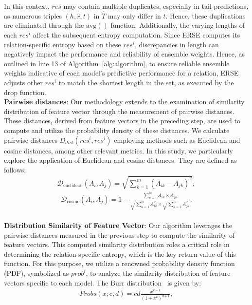 \documentclass{article}
\begin{document}
In this context, $res$ may contain multiple duplicates, especially in tail-predictions, as numerous triples $(h, \hat{r}, t)$ in $\hat{T}$ may only differ in $t$. Hence, these duplications are eliminated through the $\mathrm{avg()}$ function. Additionally, the varying lengths of each $res^i$ affect the subsequent entropy computation. Since ERSE computes its relation-specific entropy based on these $res^i$, discrepancies in length can negatively impact the performance and reliability of ensemble weights. Hence, as outlined in line 13 of Algorithm~\ref{alg:algorithm}, to ensure reliable ensemble weights indicative of each model's predictive performance for a relation, ERSE adjusts other $res^i$ to match the shortest length in the set, as executed by the $\mathrm{drop}$ function. 
\\
\textbf{Pairwise distances}: Our methodology extends to the examination of similarity distribution of feature vector through the measurement of pairwise distances. These distances, derived from feature vectors in the preceding step, are used to compute and utilize the probability density of these distances. We calculate pairwise distances $D_{\mathit{dist}}(res^{i}, res^{i})$ employing methods such as Euclidean and cosine distances, among other relevant metrics. In this study, we particularly explore the application of Euclidean and cosine distances. They are defined as follows:
\begin{align}
\label{eq:DistEu}
    \mathcal{D}_{\text{euclidean}}(A_i, A_j) = \sqrt{\sum_{k=1}^{m}(A_{ik} - A_{jk})^2},
\end{align}%
\begin{align}
\label{eq:DistLogit}
    \mathcal{D}_{\text{cosine}}(A_i, A_j) = 1 - \frac{\sum_{k=1}^{m}A_{ik} \times A_{jk}}{\sqrt{\sum_{k=1}^{m}A_{ik}^2} \times \sqrt{\sum_{k=1}^{m}A_{jk}^2}}.
\end{align}%
\\
\textbf{Distribution Similarity of Feature Vector}:
Our algorithm leverages the pairwise distances measured in the previous step to compute the similarity of feature vectors. This computed similarity distribution roles a critical role in determining the relation-specific entropy, which is the key return value of this function. For this purpose, we utilize a renowned probability density function (PDF), symbolized as $prob^i$, to analyze the similarity distribution of feature vectors specific to each model. The Burr distribution~\cite{burr1942cumulative} is given by:
\begin{align}
\label{eq:PDF}
    Probs(x; c, d) = cd \frac{x^{c-1}}{(1 + x^c)^{d+1}},        
\end{align}%
\end{document}
